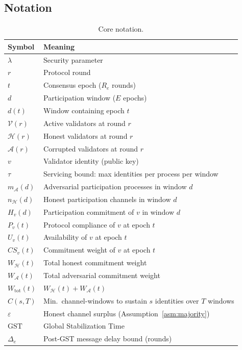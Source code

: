 \documentclass[10pt,journal,twoside]{IEEEtran}
\theoremstyle{remark}
\newcommand{\CS}{\mathit{CS}}
\begin{document}
	\subsection{Notation}
	\label{ssec:notation}
	
	\begin{table}[t]
		\caption{Core notation.}
		\label{tab:notation}
		\renewcommand{\arraystretch}{1.2}
		\begin{tabular}{@{}ll@{}}
			\toprule
			\textbf{Symbol} & \textbf{Meaning} \\
			\midrule
			$\lambda$              & Security parameter \\
			$r$                    & Protocol round \\
			$t$                    & Consensus epoch ($R_e$ rounds) \\
			$d$                    & Participation window ($E$ epochs) \\
			$d(t)$                 & Window containing epoch $t$ \\
			$\mathcal{V}(r)$       & Active validators at round $r$ \\
			$\mathcal{H}(r)$       & Honest validators at round $r$ \\
			$\mathcal{A}(r)$       & Corrupted validators at round $r$ \\
			$v$                    & Validator identity (public key) \\
			$\tau$                 & Servicing bound: max identities per
			process per window \\
			$m_{\mathcal{A}}(d)$   & Adversarial participation processes
			in window $d$ \\
			$n_{\mathcal{H}}(d)$   & Honest participation channels in
			window $d$ \\
			$H_v(d)$               & Participation commitment of $v$
			in window $d$ \\
			$P_v(t)$               & Protocol compliance of $v$ at
			epoch $t$ \\
			$U_v(t)$               & Availability of $v$ at epoch $t$ \\
			$\CS_v(t)$             & Commitment weight of $v$ at
			epoch $t$ \\
			$W_{\mathcal{H}}(t)$   & Total honest commitment weight \\
			$W_{\mathcal{A}}(t)$   & Total adversarial commitment weight \\
			$W_{\mathrm{tot}}(t)$  & $W_{\mathcal{H}}(t)+W_{\mathcal{A}}(t)$ \\
			$C(s,T)$               & Min.\ channel-windows to sustain
			$s$ identities over $T$ windows \\
			$\varepsilon$          & Honest channel surplus
			(Assumption~\ref{asm:majority}) \\
			$\mathrm{GST}$         & Global Stabilization Time \\
			$\Delta_e$             & Post-GST message delay bound (rounds) \\
			\bottomrule
		\end{tabular}
	\end{table}
	
\end{document}
